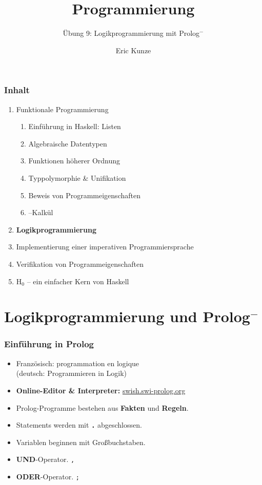 \documentclass{beamer}
\renewcommand{\emph}[1]{\textbf{#1}}
\begin{document}
	
	\title{Programmierung}
	\subtitle{Übung 9: Logikprogrammierung mit Prolog${}^-$}
	\author{Eric Kunze}
	\date{}
	
	\maketitle
	


\begin{frame}[fragile] \frametitle{Inhalt}
	\begin{enumerate}
		\item Funktionale Programmierung
		\begin{enumerate}
			\item Einführung in Haskell: Listen
			\item Algebraische Datentypen
			\item Funktionen höherer Ordnung
			\item Typpolymorphie \& Unifikation
			\item Beweis von Programmeigenschaften
			\item \textlambda--Kalkül
		\end{enumerate}
		\item \textbf{Logikprogrammierung}
		\item Implementierung einer imperativen Programmiersprache
		\item Verifikation von Programmeigenschaften
		\item H${}_\text{0}$ -- ein einfacher Kern von Haskell
	\end{enumerate}
\end{frame}


\section{Logikprogrammierung und Prolog${}^-$}

\begin{frame} \frametitle{Einführung in Prolog}
	\small
	\begin{itemize}
		\item Französisch: programmation en logique \\
		(deutsch: Programmieren in Logik)
		\item \emph{Online-Editor \& Interpreter:} \url{swish.swi-prolog.org}
		\item Prolog-Programme bestehen aus \emph{Fakten} und \emph{Regeln}.
		\bigskip
		\item Statements werden mit \emph{\texttt{.}} abgeschlossen.
		\item Variablen beginnen mit Großbuchstaben.
		\bigskip
		\item \emph{UND}-Operator. \hspace{.2cm} \texttt{,}
		\item \emph{ODER}-Operator.\hspace{.2cm} \texttt{;}
	\end{itemize}
\end{frame}
\end{document}
